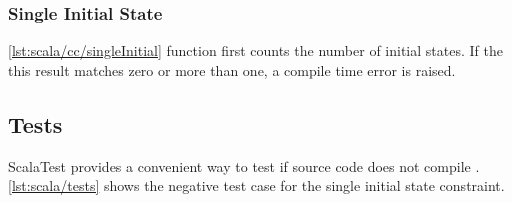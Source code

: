 \subsubsection{Single Initial State}

\autoref{lst:scala/cc/singleInitial} function first counts the number of initial states.
If the this result matches zero or more than one, a compile time error is raised.



\subsection{Tests}

ScalaTest provides a convenient way to test if source code does not compile \cite{scalatest}.
\autoref{lst:scala/tests} shows the negative test case for the single initial state constraint.



